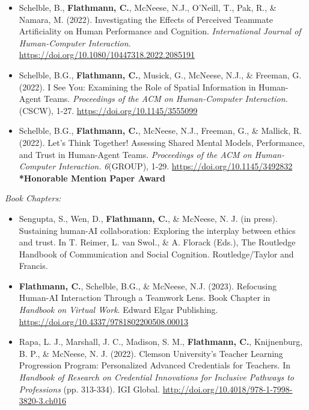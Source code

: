 \begin{itemize}[align=left, labelwidth=3em,]
\item[JA.3] Schelble, B., \textbf{Flathmann, C.}, McNeese, N.J., O'Neill, T., Pak, R., \& Namara, M. (2022). Investigating the Effects of Perceived Teammate Artificiality on Human Performance and Cognition. \textit{International Journal of Human-Computer Interaction}. \url{https://doi.org/10.1080/10447318.2022.2085191}\\

\item[JA.2] Schelble, B.G., \textbf{Flathmann, C.}, Musick, G., McNeese, N.J., \& Freeman, G. (2022). I See You: Examining the Role of Spatial Information in Human-Agent Teams. \textit{Proceedings of the ACM on Human-Computer Interaction.} (CSCW), 1-27. \url{https://doi.org/10.1145/3555099}\\

\item[\faTrophy \hspace{1pt} JA.1] Schelble, B.G., \textbf{Flathmann, C.}, McNeese, N.J., Freeman, G., \& Mallick, R. (2022). Let's Think Together! Assessing Shared Mental Models, Performance, and Trust in Human-Agent Teams. \textit{Proceedings of the ACM on Human-Computer Interaction.} \textit{6}(GROUP), 1-29. \url{https://doi.org/10.1145/3492832} \textbf{*Honorable Mention Paper Award} \\

\end{itemize}


\bigskip \noindent
\textit{Book Chapters:} 
\bigskip \noindent

\begin{itemize}[align=left, labelwidth=3em,]
\setlength\itemsep{1em}

\item[B.3] Sengupta, S., Wen, D., \textbf{Flathmann, C.}, \& McNeese, N. J. (in press). Sustaining human-AI collaboration: Exploring the interplay between ethics and trust. In T. Reimer, L. van Swol., \& A. Florack (Eds.), The Routledge Handbook of Communication and Social Cognition. Routledge/Taylor and Francis.

\item[B.2] \textbf{Flathmann, C.}, Schelble, B.G., \& McNeese, N.J. (2023). Refocusing Human-AI Interaction Through a Teamwork Lens. Book Chapter in \textit{Handbook on Virtual Work}. Edward Elgar Publishing. \url{https://doi.org/10.4337/9781802200508.00013}\\

\item[B.1] Rapa, L. J., Marshall, J. C., Madison, S. M., \textbf{Flathmann, C.}, Knijnenburg, B. P., \& McNeese, N. J. (2022). Clemson University's Teacher Learning Progression Program: Personalized Advanced Credentials for Teachers. In \textit{Handbook of Research on Credential Innovations for Inclusive Pathways to Professions} (pp. 313-334). IGI Global. \url{http://doi.org/10.4018/978-1-7998-3820-3.ch016} \\

\end{itemize}

